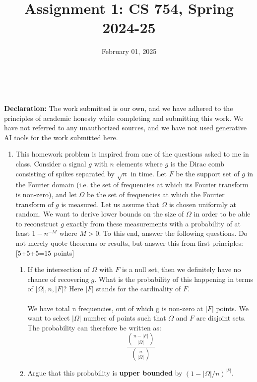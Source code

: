 \documentclass{article}
\title{Assignment 1: CS 754, Spring 2024-25}
\author{
\IEEEauthorblockN{
    \begin{tabular}{cccc}
        \begin{minipage}[t]{0.23\textwidth}
            \centering
            Amitesh Shekhar\\
            IIT Bombay\\
            22b0014@iitb.ac.in
        \end{minipage} & 
        \begin{minipage}[t]{0.23\textwidth}
            \centering
            Anupam Rawat\\
            IIT Bombay\\
            22b3982@iitb.ac.in
        \end{minipage} & 
        \begin{minipage}[t]{0.23\textwidth}
            \centering
            Toshan Achintya Golla\\
            IIT Bombay\\
            22b2234@iitb.ac.in
        \end{minipage} \\
        \\ 
    \end{tabular}
}
}
\date{February 01, 2025}
\begin{document}
\maketitle

\\
\\

\textbf{Declaration:} The work submitted is our own, and
we have adhered to the principles of academic honesty while completing and submitting this work. We have not
referred to any unauthorized sources, and we have not used generative AI tools for the work submitted here.

\begin{enumerate}
    \item This homework problem is inspired from one of the questions asked to me in class. Consider a signal $g$ with $n$ elements where $g$ is the Dirac comb consisting of spikes separated by $\sqrt{n}$ in time. Let $F$ be the support set of $g$ in the Fourier domain (i.e. the set of frequencies at which its Fourier transform is non-zero), and let $\Omega$ be the set of frequencies at which the Fourier transform of $g$ is measured. Let us assume that $\Omega$ is chosen uniformly at random. We want to derive lower bounds on the size of $\Omega$ in order to be able to reconstruct $g$ exactly from these measurements with a probability of at least $1-n^{-M}$ where $M > 0$. To this end, answer the following questions. Do not merely quote theorems or results, but answer this from first principles: \textsf{[5+5+5=15 points]}

    \begin{enumerate}
            \item
                If the intersection of $\Omega$ with $F$ is a null set, then we definitely have no chance of recovering $g$. What is the probability of this happening in terms of $|\Omega|, n, |F|$? Here $|F|$ stands for the cardinality of $F$.
            \\
    
    \\
    We have total n frequencies, out of which g is non-zero at ${|F|}$ points. We want to select $|\Omega|$ number of points such that $\Omega$ and $F$ are disjoint sets. The probability can therefore be written as:
    \[
    \frac{\binom{n-|F|}{|\Omega|}}{\binom{n}{|\Omega|}}
    \]
            \item 
                Argue that this probability is \textbf{upper bounded} by $(1-|\Omega|/n)^{|F|}$.
            \\
    

\end{enumerate}
\end{enumerate}
\end{document}
